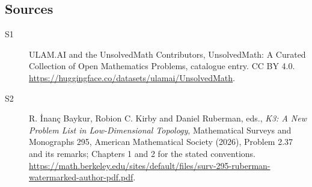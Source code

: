 \documentclass[11pt]{article}
\begin{document}
\subsection{Sources}
\begin{description}
\item[\hypertarget{source:statement:1}{S1}] ULAM.AI and the UnsolvedMath Contributors, UnsolvedMath: A Curated Collection of Open Mathematics Problems, catalogue entry. CC BY 4.0. \url{https://huggingface.co/datasets/ulamai/UnsolvedMath}.
\item[\hypertarget{source:statement:2}{S2}] R. İnanç Baykur, Robion C. Kirby and Daniel Ruberman, eds., \emph{K3: A New Problem List in Low-Dimensional Topology}, Mathematical Surveys and Monographs 295, American Mathematical Society (2026), Problem 2.37 and its remarks; Chapters 1 and 2 for the stated conventions. \url{https://math.berkeley.edu/sites/default/files/surv-295-ruberman-watermarked-author-pdf.pdf}.
\end{description}
\label{end:statement}
\end{document}
